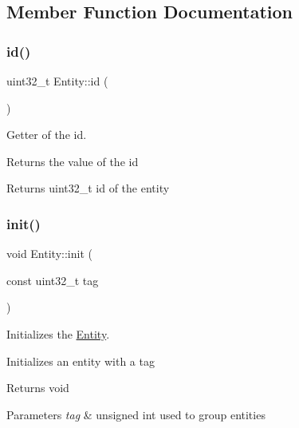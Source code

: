 \subsection{Member Function Documentation}
\mbox{\label{class_entity_ae4a75e659a4426f57f5c1d44f1b8ef34}} 
\subsubsection{\texorpdfstring{id()}{id()}}
{\footnotesize\ttfamily uint32\+\_\+t Entity\+::id (\begin{DoxyParamCaption}{ }\end{DoxyParamCaption})}



Getter of the id. 

Returns the value of the id

\begin{DoxyReturn}{Returns}
uint32\+\_\+t id of the entity 
\end{DoxyReturn}
\mbox{\label{class_entity_a085fa2dd2c2b1f3f60d601a68d5c6773}} 
\subsubsection{\texorpdfstring{init()}{init()}\hspace{0.1cm}{\footnotesize\ttfamily [1/2]}}
{\footnotesize\ttfamily void Entity\+::init (\begin{DoxyParamCaption}\item[{const uint32\+\_\+t}]{tag }\end{DoxyParamCaption})}



Initializes the \hyperlink{class_entity}{Entity}. 

Initializes an entity with a tag

\begin{DoxyReturn}{Returns}
void 
\end{DoxyReturn}

\begin{DoxyParams}{Parameters}
{\em tag} & unsigned int used to group entities \\
\hline
\end{DoxyParams}
\mbox{\label{class_entity_a93bfb0b92c06297c207fad4164810fed}} 
